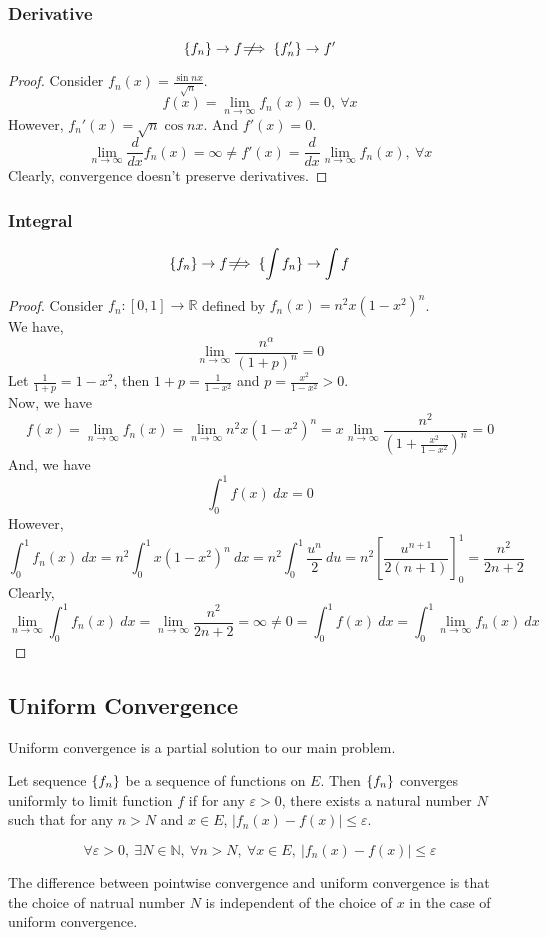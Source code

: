\subsubsection{Derivative}
\[ \{f_n\} \to f \not\!\!\!\implies \{f_n'\} \to f' \]
\begin{proof}
	Consider $f_n(x) = \frac{\sin nx}{\sqrt{n}}$.
	\[ f(x) = \lim_{n \to \infty} f_n(x) = 0,\ \forall x \]
	However, $f_n'(x) = \sqrt{n} \cos nx$.
	And $f'(x) = 0$.
	\[ \lim_{n \to \infty} \frac{d}{dx} f_n(x) = \infty \ne f'(x) = \frac{d}{dx} \lim_{n \to \infty} f_n(x),\ \forall x \]
	Clearly, convergence doesn't preserve derivatives.
\end{proof}
\subsubsection{Integral}
\[ \{f_n\} \to f \not\!\!\!\implies \{ \int f_n\} \to \int f \]
\begin{proof}
	Consider $f_n : [0,1] \to \mathbb{R}$ defined by $f_n(x) = n^2 x (1-x^2)^n$.\\

	We have,
	\[ \lim_{n \to \infty} \frac{n^\alpha}{(1+p)^n} = 0 \]
	Let $\frac{1}{1+p} = 1-x^2$, then $1+p = \frac{1}{1-x^2}$ and $p = \frac{x^2}{1-x^2} > 0$.\\
	Now, we have
	\[ f(x) = \lim_{n \to \infty} f_n(x) = \lim_{n \to \infty} n^2 x(1-x^2)^n = x \lim_{n \to \infty} \frac{n^2}{\left(1+\frac{x^2}{1-x^2}\right)^n} = 0 \]
	And, we have
	\[ \int_0^1 f(x)\ dx = 0 \]
	However,
	\[ \int_0^1 f_n(x)\ dx = n^2 \int_0^1 x(1-x^2)^n\ dx = n^2 \int_0^1 \frac{u^n}{2}\ du = n^2 \left[ \frac{u^{n+1}}{2(n+1)} \right]_0^1 = \frac{n^2}{2n+2} \]
	Clearly, 
	\[ \lim_{n \to \infty} \int_0^1 f_n(x)\ dx = \lim_{n \to \infty} \frac{n^2}{2n+2} = \infty \ne 0 = \int_0^1 f(x)\ dx = \int_0^1 \lim_{n \to \infty} f_n(x)\ dx \]
\end{proof}
\subsection{Uniform Convergence}
Uniform convergence is a partial solution to our main problem.
\begin{definition}
	Let sequence $\{f_n\}$ be a sequence of functions on $E$.
	Then $\{f_n\}$ converges uniformly to limit function $f$ if for any $\varepsilon > 0$, there exists a natural number $N$ such that for any $n > N$ and $x \in E$, $|f_n(x) - f(x)| \le \varepsilon$.
\end{definition}
\begin{important}
	\[ \forall \varepsilon > 0,\ \exists N \in \mathbb{N},\ \forall n > N,\ \forall x \in E,\ |f_n(x) - f(x)| \le \varepsilon \]
\end{important}
\begin{commentary}
	The difference between pointwise convergence and uniform convergence is that the choice of natrual number $N$ is independent of the choice of $x$ in the case of uniform convergence.
\end{commentary}
